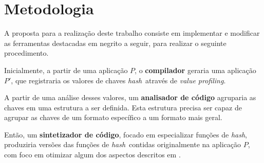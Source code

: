 \documentclass[12pt]{article}
\newcommand{\hash}{\textit{hash}}
\begin{document}

\section{Metodologia}


A proposta para a realização deste trabalho consiste em implementar e modificar as ferramentas destacadas em negrito a seguir, para realizar o seguinte procedimento.

Inicialmente, a partir de uma aplicação $P$, o \textbf{compilador} geraria uma aplicação $P'$, que registraria os valores de chaves \hash\ através de \textit{value profiling}.

A partir de uma análise desses valores, um \textbf{analisador de código} agruparia as chaves em uma estrutura a ser definida. Esta estrutura precisa ser capaz de agrupar as chaves de um formato específico a um formato mais geral.

Então, um \textbf{sintetizador de código}, focado em especializar funções de \hash, produziria versões das funções de \hash\ contidas originalmente na aplicação $P$, com foco em otimizar algum dos aspectos descritos em \cite{estebanez2014performance}.
\end{document}
